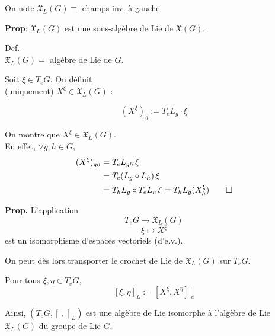 \documentclass[11pt,a4paper]{article}
\begin{document}
	On note $\mathfrak{X}_L(G) \equiv$ champs inv. à gauche.
	
	\vspace{1em}
	
	\noindent
	\textbf{Prop}: $\mathfrak{X}_L(G)$ est une sous-algèbre de Lie de $\mathfrak{X}(G)$.
	
	\underline{Def.} \\
	$\mathfrak{X}_L(G) =$ algèbre de Lie de $G$.
	
	\vspace{1em}
	
	Soit $\xi \in T_e G$. On définit \\
	(uniquement) $X^\xi \in \mathfrak{X}_L(G)$ :
	
	\[
	(X^\xi)_g := T_e L_g \cdot \xi
	\]
	
	
	On montre que $X^\xi \in \mathfrak{X}_L(G)$. \\
	En effet, $\forall g, h \in G$,
\begin{align*}
	(X^\xi)_{gh} &= T_e L_{gh} \, \xi \\
	\phantom{(X^\xi)_{gh}} &= T_e(L_g \circ L_h) \, \xi \\
	\phantom{(X^\xi)_{gh}} &  = T_h L_g \circ T_e L_h \, \xi = T_h L_g (X^\xi_h) \qed \\
\end{align*}

\textbf{Prop.} L'application
\[
T_e G \longrightarrow \mathfrak{X}_L(G)
\]
\[
\xi \longmapsto X^\xi
\]
est un isomorphisme d'espaces vectoriels (d'e.v.).

\vspace{1em}

On peut dès lors transporter le crochet de Lie de $\mathfrak{X}_L(G)$ sur $T_e G$.

Pour tous $\xi, \eta \in T_e G$,
\[
[\xi, \eta]_L := [X^\xi, X^\eta] \big|_e
\]

Ainsi, $(T_e G, [\, , \, ]_L)$ est une algèbre de Lie isomorphe à l'algèbre de Lie $\mathfrak{X}_L(G)$ du groupe de Lie $G$.


	
\end{document}
